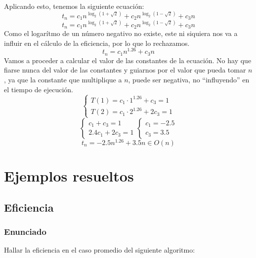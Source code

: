 \documentclass[10pt,a4paper,spanish]{report}
\theoremstyle{definition}
\theoremstyle{remark}
\begin{document}
\begin{center}
    ~\\
    Aplicando esto, tenemos la siguiente ecuación:
    $$t_n = c_1n^{\log_2(1+\sqrt{2})} + c_2n^{\log_2(1-\sqrt{2})}+c_3n$$
    $$t_n = c_1n^{\log_2(1+\sqrt{2})} + c_2n^{\log_2(1-\sqrt{2})}+c_3n$$
    Como el logarítmo de un número negativo no existe, este ni siquiera nos va a influir en el cálculo de la eficiencia, por lo que lo rechazamos.
    $$t_n = c_1n^{1.26}+c_3n$$
    Vamos a proceder a calcular el valor de las constantes de la ecuación. No hay que fiarse nunca del valor de las constantes y guiarnos por el valor que pueda tomar $n$, ya que la constante que multiplique a $n$, puede ser negativa, no ``influyendo'' en el tiempo de ejecución.
    \begin{displaymath}
        \left\{ \begin{array}{ll}
        T(1) = c_1\cdot 1^{1.26} + c_3 = 1\\
        T(2) = c_1\cdot 2^{1.26} + 2c_3 = 1
    \end{array} \right.
    \end{displaymath}
    \begin{displaymath}
        \left\{ \begin{array}{ll}
        c_1 + c_3 = 1\\
        2.4c_1 + 2c_3 = 1
    \end{array} \right.
        \left\{ \begin{array}{ll}
        c_1 = -2.5\\
        c_3 = 3.5
    \end{array} \right.
    \end{displaymath}
    $$t_n = -2.5n^{1.26}+3.5n \in O(n)$$
\end{center}

\chapter{\textcolor[rgb]{0.1,0.2,1}Ejemplos resueltos}

\section{\textcolor[rgb]{0.1,0.2,1}Eficiencia}

\subsection{\textcolor[rgb]{0.1,0.2,1}Enunciado}

Hallar la eficiencia en el caso promedio del siguiente algoritmo:\\
\end{document}
